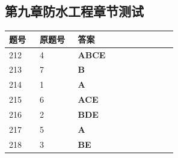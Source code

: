 \documentclass[UTF8,fontset=windows,11pt]{ctexart}
\begin{document}
\subsection*{第九章防水工程章节测试}
\begin{longtable}{p{0.16\linewidth}p{0.2\linewidth}p{0.52\linewidth}}
\textbf{\textcolor{examnavy}{题号}} & \textbf{\textcolor{examnavy}{原题号}} & \textbf{\textcolor{answergreen}{答案}} \\
\hline
212 & 4 & \textbf{\textcolor{answergreen}{ABCE}} \\
213 & 7 & \textbf{\textcolor{answergreen}{B}} \\
214 & 1 & \textbf{\textcolor{answergreen}{A}} \\
215 & 6 & \textbf{\textcolor{answergreen}{ACE}} \\
216 & 2 & \textbf{\textcolor{answergreen}{BDE}} \\
217 & 5 & \textbf{\textcolor{answergreen}{A}} \\
218 & 3 & \textbf{\textcolor{answergreen}{BE}} \\
\end{longtable}
\vspace{0.4em}
\end{document}
